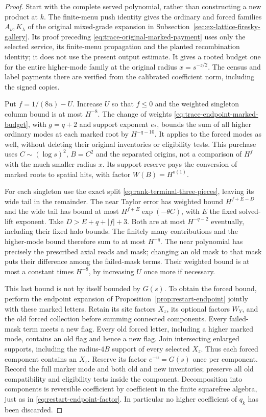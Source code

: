 \begin{proof}
Start with the complete served polynomial, rather than constructing a
new product at $k$. The finite-menu push identity gives the ordinary
and forced families $A_\nu,K_\lambda$ of the original mixed-grade
expansion in Subsection~\ref{sec:ex-lattice-firesky-gallery}. Its proof preceding
\eqref{eq:trace-original-marked-payment} uses only the selected service,
its finite-menu propagation and the planted recombination identity;
it does not use the present output estimate. It gives a rooted budget
one for the entire higher-mode family at the original radius
$x=s^{-z/2}$. The census and label payments there are verified from the
calibrated coefficient norm, including the signed copies.

Put $f=1/(8u)-U$. Increase $U$ so that $f\le0$ and the weighted
singleton column bound is at most $H^{-8}$. The change of weights
\eqref{eq:trace-endpoint-marked-budget}, with $g=q+2$ and support
exponent $e_*$, bounds the sum of all higher ordinary modes at each
marked root by $H^{-q-10}$. It applies to the forced modes as well,
without deleting their original inventories or eligibility tests.
This purchase uses $C\sim(\log s)^2$, $B=C^2$ and the separated
origins, not a comparison of $H^f$ with the much smaller radius $x$.
Its support reserve pays the conversion of marked roots to spatial
hits, with factor $W(B)=H^{o(1)}$.

For each singleton use the exact split
\eqref{eq:rank-terminal-three-pieces}, leaving its wide tail in the
remainder. The near Taylor error has weighted bound
$H^{f+E-D}$ and the wide tail has bound at most
$H^{f+E}\exp(-\theta C)$, with $E$ the fixed solved-lift exponent.
Take $D>E+q+|f|+3$. Both are at most $H^{-q-2}$ eventually,
including their fixed halo bounds. The finitely many contributions
and the higher-mode bound therefore sum to at most $H^{-q}$.
The near polynomial has precisely the prescribed axial reads and
mask; changing an old mask to that mask puts their difference among
the failed-mask terms. Their weighted bound is at most a constant
times $H^{-8}$, by increasing $U$ once more if necessary.

This last bound is not by itself bounded by $G(s)$. To obtain the
forced bound, perform the endpoint expansion of
Proposition~\ref{prop:restart-endpoint} jointly with these marked
letters. Retain its site factors $X_z$, its optional factors $W_Y$,
and the old forced collection before summing connected components.
Every failed-mask term meets a new flag. Every old forced letter,
including a higher marked mode, contains an old flag and hence a new
flag. Join intersecting enlarged supports, including the radius-$4B$
support of every selected $X_z$. Thus each forced component contains
an $X_z$. Reserve its factor $e^{-u}=G(s)$ once per component.
Record the full marker mode and both old and new inventories; preserve
all old compatibility and eligibility tests inside the component.
Decomposition into components is reversible coefficient by coefficient
in the finite squarefree algebra, just as in
\eqref{eq:restart-endpoint-factor}. In particular no higher coefficient
of $q_k$ has been discarded.


\end{proof}
